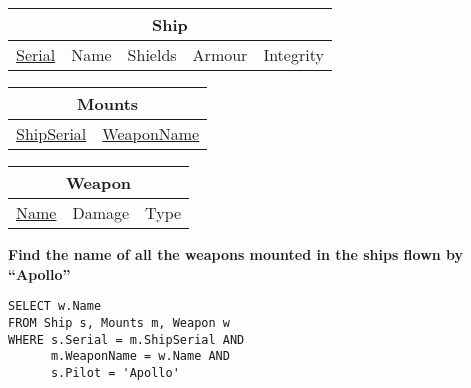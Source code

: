 \documentclass{beamer}
\begin{document}
\begin{frame}[fragile]

\begin{tabular}{|c|c|c|c|c|}
\hline
\multicolumn{5}{|c|}{\textbf{Ship}} \\
\hline
\underline{Serial} & Name & Shields & Armour & Integrity \\
\hline
\end{tabular}

\begin{tabular}{|c|c|}
\hline
\multicolumn{2}{|c|}{\textbf{Mounts}} \\
\hline
\underline{ShipSerial} & \underline{WeaponName} \\
\hline
\end{tabular}

\begin{tabular}{|c|c|c|}
\hline
\multicolumn{3}{|c|}{\textbf{Weapon}} \\
\hline
\underline{Name} & Damage & Type \\
\hline
\end{tabular}

\vspace{0.25cm}
\textbf{Find the name of all the weapons mounted in the ships flown by ``Apollo''}

\pause
\begin{lstlisting}[showstringspaces=false]
SELECT w.Name
FROM Ship s, Mounts m, Weapon w
WHERE s.Serial = m.ShipSerial AND 
      m.WeaponName = w.Name AND
      s.Pilot = 'Apollo'
\end{lstlisting}

\end{frame}
\end{document}
